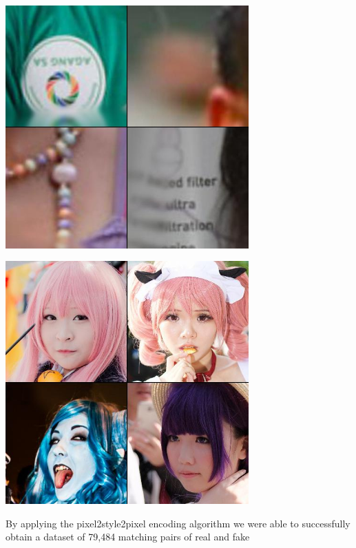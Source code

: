 \documentclass[11pt, letterpaper]{article}
\newenvironment{Figure}
  {\par\medskip\noindent\minipage{\linewidth}}
  {\endminipage\par\medskip}
\begin{document}
\begin{multicols}{2}
  \begin{Figure}
    \centering
    \includegraphics[width=0.7\textwidth]{figures/false-positives.jpg}
    \label{falsepos}
  \end{Figure}

  \begin{Figure}
    \centering
    \includegraphics[width=0.7\textwidth]{figures/false-negatives.jpg}
    \label{falseneg}
  \end{Figure}

  By applying the pixel2style2pixel encoding algorithm we were able to
  successfully obtain a dataset of 79,484 matching pairs of real and fake


\end{multicols}
\end{document}
